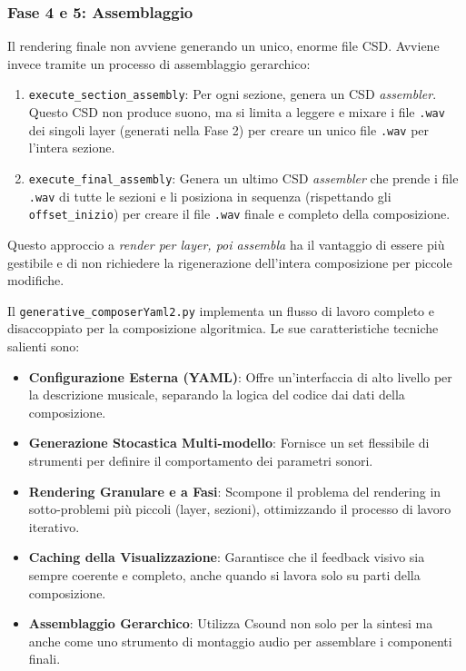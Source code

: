 \subsubsection{Fase 4 e 5: Assemblaggio}
Il rendering finale non avviene generando un unico, enorme file CSD. Avviene invece tramite un processo di assemblaggio gerarchico:

\begin{enumerate}
    \item \texttt{execute\_section\_assembly}: Per ogni sezione, genera un CSD \textit{assembler}. Questo CSD non produce suono, ma si limita a leggere e mixare i file \texttt{.wav} dei singoli layer (generati nella Fase 2) per creare un unico file \texttt{.wav} per l'intera sezione.
    \item \texttt{execute\_final\_assembly}: Genera un ultimo CSD \textit{assembler} che prende i file \texttt{.wav} di tutte le sezioni e li posiziona in sequenza (rispettando gli \texttt{offset\_inizio}) per creare il file \texttt{.wav} finale e completo della composizione.
\end{enumerate}
Questo approccio a \textit{render per layer, poi assembla} ha il vantaggio di essere più gestibile e di non richiedere la rigenerazione dell'intera composizione per piccole modifiche.

Il \texttt{generative\_composerYaml2.py} implementa un flusso di lavoro completo e disaccoppiato per la composizione algoritmica. Le sue caratteristiche tecniche salienti sono:

\begin{itemize}
    \item \textbf{Configurazione Esterna (YAML)}: Offre un'interfaccia di alto livello per la descrizione musicale, separando la logica del codice dai dati della composizione.
    \item \textbf{Generazione Stocastica Multi-modello}: Fornisce un set flessibile di strumenti per definire il comportamento dei parametri sonori.
    \item \textbf{Rendering Granulare e a Fasi}: Scompone il problema del rendering in sotto-problemi più piccoli (layer, sezioni), ottimizzando il processo di lavoro iterativo.
    \item \textbf{Caching della Visualizzazione}: Garantisce che il feedback visivo sia sempre coerente e completo, anche quando si lavora solo su parti della composizione.
    \item \textbf{Assemblaggio Gerarchico}: Utilizza Csound non solo per la sintesi ma anche come uno strumento di montaggio audio per assemblare i componenti finali.
\end{itemize}